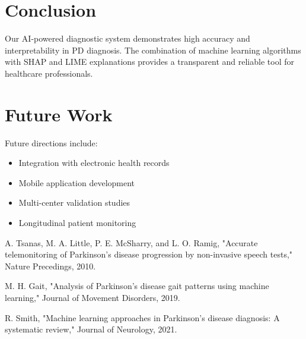 \documentclass[conference]{IEEEtran}
\begin{document}
\section{Conclusion}
Our AI-powered diagnostic system demonstrates high accuracy and interpretability in PD diagnosis. The combination of machine learning algorithms with SHAP and LIME explanations provides a transparent and reliable tool for healthcare professionals.

\section{Future Work}
Future directions include:
\begin{itemize}
    \item Integration with electronic health records
    \item Mobile application development
    \item Multi-center validation studies
    \item Longitudinal patient monitoring
\end{itemize}

\begin{thebibliography}{3}
 A. Tsanas, M. A. Little, P. E. McSharry, and L. O. Ramig, "Accurate telemonitoring of Parkinson's disease progression by non-invasive speech tests," Nature Precedings, 2010.

 M. H. Gait, "Analysis of Parkinson's disease gait patterns using machine learning," Journal of Movement Disorders, 2019.

 R. Smith, "Machine learning approaches in Parkinson's disease diagnosis: A systematic review," Journal of Neurology, 2021.
\end{thebibliography}
\end{document}
